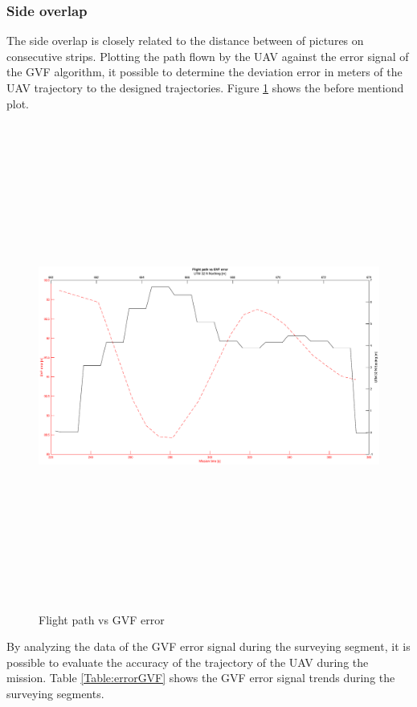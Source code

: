 \subsubsection{Side overlap}
The side overlap is closely related to the distance between of pictures on consecutive strips. Plotting  the path flown by the UAV against the error signal of the GVF algorithm, it possible to determine the deviation error in meters of the UAV trajectory to the designed trajectories. Figure \ref{fig:errorsignalGVF} shows the before mentiond plot.
\begin{figure}[H]
\centering
\includegraphics[width=16cm,height=16cm,keepaspectratio]{imagenes/StripvsGVF.eps}
\caption{Flight path vs GVF error}
\label{fig:errorsignalGVF}
\end{figure}
By analyzing the data of the GVF error signal during the surveying segment, it is possible to evaluate the accuracy of the trajectory of the UAV during the mission. Table \ref{Table:errorGVF} shows the GVF error signal trends during the surveying segments.

